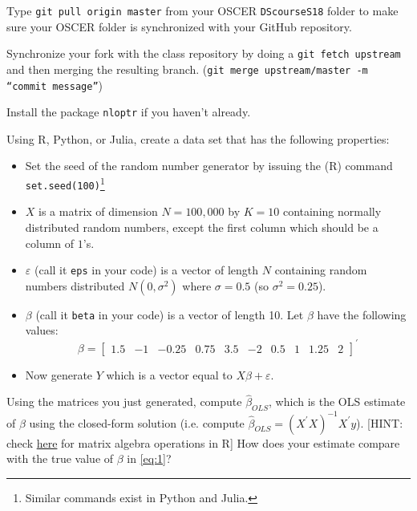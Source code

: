 \documentclass[12pt,english]{exam}
\begin{document}
\begin{questions}
\question Type \texttt{git pull origin master} from your OSCER \texttt{DScourseS18} folder to make sure your OSCER folder is synchronized with your GitHub repository. 

\question Synchronize your fork with the class repository by doing a \texttt{git fetch upstream} and then merging the resulting branch. (\texttt{git merge upstream/master -m ``commit message''})

\question Install the package \texttt{nloptr} if you haven't already.

\question Using R, Python, or Julia, create a data set that has the following properties:
\begin{itemize}
    \item Set the seed of the random number generator by issuing the (R) command \texttt{set.seed(100)}\footnote{Similar commands exist in Python and Julia.}
    \item $X$ is a matrix of dimension $N=100,000$ by $K=10$ containing normally distributed random numbers, except the first column which should be a column of $1$'s. 
    \item $\varepsilon$ (call it \texttt{eps} in your code) is a vector of length $N$ containing random numbers distributed $N\left(0,\sigma^{2}\right)$ where $\sigma=0.5$ (so $\sigma^{2} = 0.25$).
    \item $\beta$ (call it \texttt{beta} in your code) is a vector of length 10. Let $\beta$ have the following values:
        \begin{equation}
            \label{eq:1}
           \beta = \left[\begin{array}{cccccccccc}
            1.5 & -1 & -0.25 & 0.75 & 3.5 & -2 & 0.5 & 1 & 1.25 & 2
            \end{array}\right]^{\prime}
        \end{equation}
    \item Now generate $Y$ which is a vector equal to $X\beta + \varepsilon$.
\end{itemize}

\question Using the matrices you just generated, compute $\hat{\beta}_{OLS}$, which is the OLS estimate of $\beta$ using the closed-form solution (i.e. compute $\hat{\beta}_{OLS} = \left(X^{\prime}X\right)^{-1}X^{\prime}y$). [HINT: check \href{https://www.statmethods.net/advstats/matrix.html}{here} for matrix algebra operations in R] How does your estimate compare with the true value of $\beta$ in \eqref{eq:1}?


\end{questions}
\end{document}
